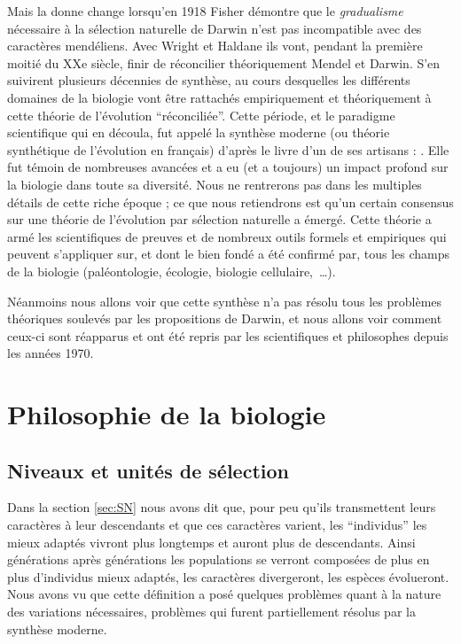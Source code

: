 Mais la donne change lorsqu'en 1918 Fisher démontre que le \emph{gradualisme} nécessaire à la sélection naturelle de Darwin n'est pas incompatible avec des caractères mendéliens. Avec Wright et Haldane ils vont, pendant la première moitié du XXe siècle, finir de réconcilier théoriquement Mendel et Darwin. S'en suivirent plusieurs décennies de synthèse, au cours desquelles les différents domaines de la biologie vont être rattachés empiriquement et théoriquement à cette théorie de l'évolution ``réconciliée''. Cette période, et le paradigme scientifique qui en découla, fut appelé la synthèse moderne (ou théorie synthétique de l'évolution en français) d'après le livre d'un de ses artisans : \cite{huxley1942evolution}. Elle fut témoin de nombreuses avancées et a eu (et a toujours) un impact profond sur la biologie dans toute sa diversité. Nous ne rentrerons pas dans les multiples détails de cette riche époque ; ce que nous retiendrons est qu'un certain consensus sur une théorie de l'évolution par sélection naturelle a émergé. Cette théorie a armé les scientifiques de preuves et de nombreux outils formels et empiriques qui peuvent s'appliquer sur, et dont le bien fondé a été confirmé par, tous les champs de la biologie (paléontologie, écologie, biologie cellulaire,~\ldots). 

Néanmoins nous allons voir que cette synthèse n'a pas résolu tous les problèmes théoriques soulevés par les propositions de Darwin, et nous allons voir comment ceux-ci sont réapparus et ont été repris par les scientifiques et philosophes depuis les années 1970.

\section{Philosophie de la biologie}
\subsection{Niveaux et unités de sélection}\label{sec:lvl}
Dans la section \ref{sec:SN} nous avons dit que, pour peu qu'ils transmettent leurs caractères à leur descendants et que ces caractères varient, les ``individus'' les mieux adaptés vivront plus longtemps et auront plus de descendants. Ainsi générations après générations les populations se verront composées de plus en plus d'individus mieux adaptés, les caractères divergeront, les espèces évolueront. Nous avons vu que cette définition a posé quelques problèmes quant à la nature des variations nécessaires, problèmes qui furent partiellement résolus par la synthèse moderne.

